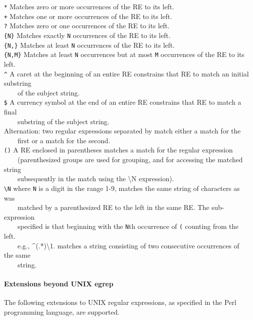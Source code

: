 \texttt{*} Matches zero or more occurrences of the RE to its
left.\\
\texttt{+} Matches one or more occurrences of the RE to its
left.\\
\texttt{?} Matches zero or one occurrences of the RE to its
left.\\
\texttt{\{N\}} Matches exactly \texttt{N} occurrences of the RE to its
left.\\
\texttt{\{N,\}} Matches at least \texttt{N} occurrences of the RE to its
left.\\
\texttt{\{N,M\}} Matches at least \texttt{N} occurrences but at most
\texttt{M} occurrences of the RE to its left.\\
\texttt{\^{}} A caret at the beginning of an entire RE constrains that
RE to match an initial substring\\
 \ \ \ \ of the subject string.\\
\texttt{\$} A currency symbol at the end of an entire RE constrains that
RE to match a final\\
 \ \ \ \ substring of the subject string.\\
\texttt{{\textbar}} Alternation: two regular expressions separated by
\texttt{{\textquotedbl}{\textbar}{\textquotedbl}} match either a match
for the\\
 \ \ \ \ first or a match for the second.\\
\texttt{()} A RE enclosed in parentheses matches a match for the regular
expression\\
 \ \ \ \ (parenthesized groups are used for grouping, and for accessing
the matched string\\
 \ \ \ \ subsequently in the match using the {\textbackslash}N
expression).\\
\texttt{{\textbackslash}N} where \texttt{N} is a digit in the range 1-9,
matches the same string of characters as was\\
 \ \ \ \ matched by a parenthesized RE to the left in the same RE. The
sub-expression\\
 \ \ \ \ specified is that beginning with the \texttt{N}th occurrence of
\texttt{{\textquotedbl}({\textquotedbl}} counting from the
left.\\
 \ \ \ \ e.g., \^{}(.*){\textbackslash}1. matches a string consisting of
two consecutive occurrences of the same\\
 \ \ \ \ string.

\paragraph{Extensions beyond UNIX egrep}
The following extensions to UNIX regular expressions, as specified in
the Perl programming language, are supported.

